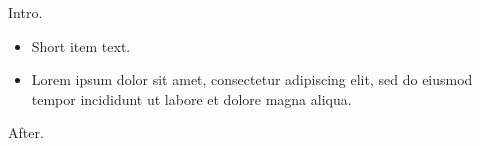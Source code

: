\documentclass[12pt]{article}
\begin{document}
Intro.
\begin{itemize}[labelsep=1em]
\item Short item text.
\item Lorem ipsum dolor sit amet, consectetur adipiscing elit, sed do eiusmod tempor incididunt ut labore et dolore magna aliqua.
\end{itemize}
After.
\end{document}
